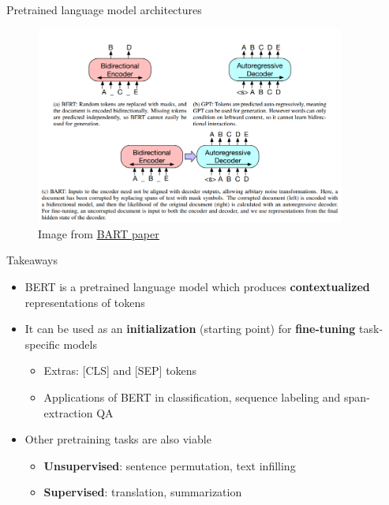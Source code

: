 \documentclass[12pt,aspectratio=169,handout]{beamer}
\begin{document}
\begin{frame}{Pretrained language model architectures}
	\begin{figure}[h]
		\includegraphics[height=6.5cm]{pretrained-lm-variants}
		\caption*{Image from \href{https://arxiv.org/pdf/1910.13461.pdf}{\underline{BART paper}}}
	\end{figure}
	
\end{frame}


\begin{frame}{Takeaways}
	
\begin{itemize}
	\item BERT is a pretrained language model which produces \textbf{contextualized} representations of tokens
	\item It can be used as an \textbf{initialization} (starting point) for \textbf{fine-tuning} task-specific models
	\begin{itemize}
		\item Extras: [CLS] and [SEP] tokens
		\item Applications of BERT in classification, sequence labeling and span-extraction QA
	\end{itemize} 
	\item Other pretraining tasks are also viable
	\begin{itemize}
		\item \textbf{Unsupervised}: sentence permutation, text infilling
		\item \textbf{Supervised}: translation, summarization
	\end{itemize}
\end{itemize}
	
\end{frame}
\end{document}
